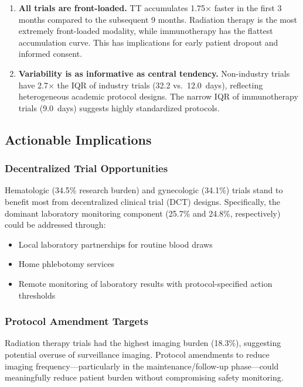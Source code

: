 \documentclass[11pt,a4paper]{article}
\begin{document}
\begin{enumerate}
    \item \textbf{All trials are front-loaded.} TT accumulates 1.75$\times$ faster in the first 3 months compared to the subsequent 9 months. Radiation therapy is the most extremely front-loaded modality, while immunotherapy has the flattest accumulation curve. This has implications for early patient dropout and informed consent.

    \item \textbf{Variability is as informative as central tendency.} Non-industry trials have 2.7$\times$ the IQR of industry trials (32.2 vs.\ 12.0~days), reflecting heterogeneous academic protocol designs. The narrow IQR of immunotherapy trials (9.0~days) suggests highly standardized protocols.
\end{enumerate}

\subsection{Actionable Implications}

\subsubsection{Decentralized Trial Opportunities}

Hematologic (34.5\% research burden) and gynecologic (34.1\%) trials stand to benefit most from decentralized clinical trial (DCT) designs. Specifically, the dominant laboratory monitoring component (25.7\% and 24.8\%, respectively) could be addressed through:
\begin{itemize}
    \item Local laboratory partnerships for routine blood draws
    \item Home phlebotomy services
    \item Remote monitoring of laboratory results with protocol-specified action thresholds
\end{itemize}

\subsubsection{Protocol Amendment Targets}

Radiation therapy trials had the highest imaging burden (18.3\%), suggesting potential overuse of surveillance imaging. Protocol amendments to reduce imaging frequency---particularly in the maintenance/follow-up phase---could meaningfully reduce patient burden without compromising safety monitoring.
\end{document}
